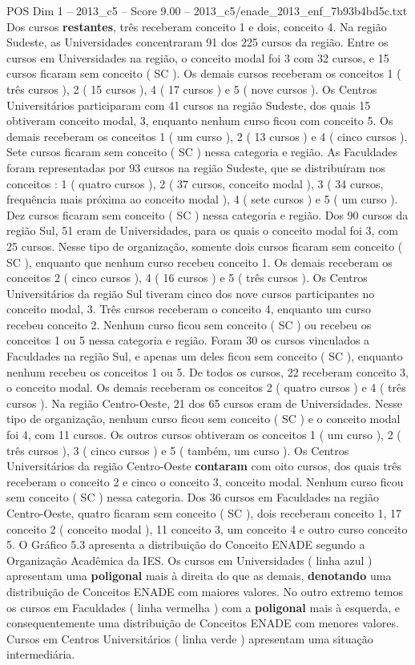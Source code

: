 \begin{textsample}{POS Dim 1 – 2013\_c5 – Score 9.00 – 2013\_c5/enade\_2013\_enf\_7b93b4bd5c.txt}
Dos cursos \textbf{restantes}, três receberam conceito 1 e dois, conceito 4.
Na região Sudeste, as Universidades concentraram 91 dos 225 cursos da região.
Entre os cursos em Universidades na região, o conceito modal foi 3 com 32 cursos, e 15 cursos ficaram sem conceito ( SC ).
Os demais cursos receberam os conceitos 1 ( três cursos ), 2 ( 15 cursos ), 4 ( 17 cursos ) e 5 ( nove cursos ).
Os Centros Universitários participaram com 41 cursos na região Sudeste, dos quais 15 obtiveram conceito modal, 3, enquanto nenhum curso ficou com conceito 5.
Os demais receberam os conceitos 1 ( um curso ), 2 ( 13 cursos ) e 4 ( cinco cursos ).
Sete cursos ficaram sem conceito ( SC ) nessa categoria e região.
As Faculdades foram representadas por 93 cursos na região Sudeste, que se distribuíram nos conceitos : 1 ( quatro cursos ), 2 ( 37 cursos, conceito modal ), 3 ( 34 cursos, frequência mais próxima ao conceito modal ), 4 ( sete cursos ) e 5 ( um curso ).
Dez cursos ficaram sem conceito ( SC ) nessa categoria e região.
Dos 90 cursos da região Sul, 51 eram de Universidades, para os quais o conceito modal foi 3, com 25 cursos.
Nesse tipo de organização, somente dois cursos ficaram sem conceito ( SC ), enquanto que nenhum curso recebeu conceito 1.
Os demais receberam os conceitos 2 ( cinco cursos ), 4 ( 16 cursos ) e 5 ( três cursos ).
Os Centros Universitários da região Sul tiveram cinco dos nove cursos participantes no conceito modal, 3.
Três cursos receberam o conceito 4, enquanto um curso recebeu conceito 2.
Nenhum curso ficou sem conceito ( SC ) ou recebeu os conceitos 1 ou 5 nessa categoria e região.
Foram 30 os cursos vinculados a Faculdades na região Sul, e apenas um deles ficou sem conceito ( SC ), enquanto nenhum recebeu os conceitos 1 ou 5.
De todos os cursos, 22 receberam conceito 3, o conceito modal.
Os demais receberam os conceitos 2 ( quatro cursos ) e 4 ( três cursos ).
Na região Centro-Oeste, 21 dos 65 cursos eram de Universidades.
Nesse tipo de organização, nenhum curso ficou sem conceito ( SC ) e o conceito modal foi 4, com 11 cursos.
Os outros cursos obtiveram os conceitos 1 ( um curso ), 2 ( três cursos ), 3 ( cinco cursos ) e 5 ( também, um curso ).
Os Centros Universitários da região Centro-Oeste \textbf{contaram} com oito cursos, dos quais três receberam o conceito 2 e cinco o conceito 3, conceito modal.
Nenhum curso ficou sem conceito ( SC ) nessa categoria.
Dos 36 cursos em Faculdades na região Centro-Oeste, quatro ficaram sem conceito ( SC ), dois receberam conceito 1, 17 conceito 2 ( conceito modal ), 11 conceito 3, um conceito 4 e outro curso conceito 5.
O Gráfico 5.3 apresenta a distribuição do Conceito ENADE segundo a Organização Acadêmica da IES.
Os cursos em Universidades ( linha azul ) apresentam uma \textbf{poligonal} mais à direita do que as demais, \textbf{denotando} uma distribuição de Conceitos ENADE com maiores valores.
No outro extremo temos os cursos em Faculdades ( linha vermelha ) com a \textbf{poligonal} mais à esquerda, e consequentemente uma distribuição de Conceitos ENADE com menores valores.
Cursos em Centros Universitários ( linha verde ) apresentam uma situação intermediária.


\end{textsample}

